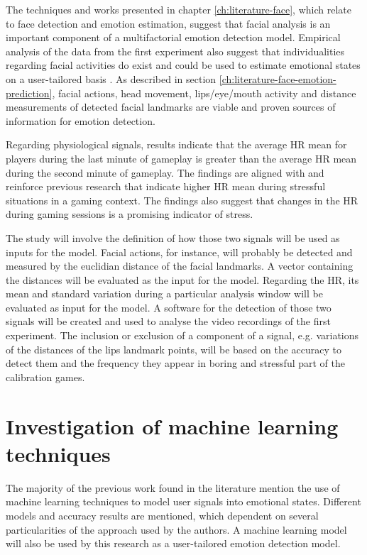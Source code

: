 The techniques and works presented in chapter \ref{ch:literature-face}, which relate to face detection and emotion estimation, suggest that facial analysis is an important component of a multifactorial emotion detection model. Empirical analysis of the data from the first experiment also suggest that individualities regarding facial activities do exist and could be used to estimate emotional states on a user-tailored basis \parencite{bevilacqua2016variations}. As described in section \ref{ch:literature-face-emotion-prediction}, facial actions, head movement, lips/eye/mouth activity and distance measurements of detected facial landmarks are viable and proven sources of information for emotion detection.

Regarding physiological signals, results indicate that the average HR mean for players during the last minute of gameplay is greater than the average HR mean during the second minute of gameplay. The findings are aligned with and reinforce previous research that indicate higher HR mean during stressful situations in a gaming context. The findings also suggest that changes in the HR during gaming sessions is a promising indicator of stress.

The study will involve the definition of how those two signals will be used as inputs for the model. Facial actions, for instance, will probably be detected and measured by the euclidian distance of the facial landmarks. A vector containing the distances will be evaluated as the input for the model. Regarding the HR, its mean and standard variation during a particular analysis window will be evaluated as input for the model. A software for the detection of those two signals will be created and used to analyse the video recordings of the first experiment. The inclusion or exclusion of a component of a signal, e.g. variations of the distances of the lips landmark points, will be based on the accuracy to detect them and the frequency they appear in boring and stressful part of the calibration games.

\section{Investigation of machine learning techniques}
\label{closing:investigation-machine-learning}

The majority of the previous work found in the literature mention the use of machine learning techniques to model user signals into emotional states. Different models and accuracy results are mentioned, which dependent on several particularities of the approach used by the authors. A machine learning model will also be used by this research as a user-tailored emotion detection model.

